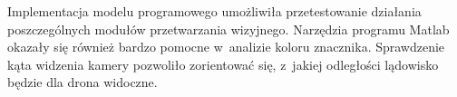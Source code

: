 Implementacja modelu programowego umożliwiła przetestowanie działania poszczególnych modułów przetwarzania wizyjnego. Narzędzia programu Matlab okazały się również bardzo pomocne w~analizie koloru znacznika. Sprawdzenie kąta widzenia kamery pozwoliło zorientować się, z~jakiej odległości lądowisko będzie dla drona widoczne.




